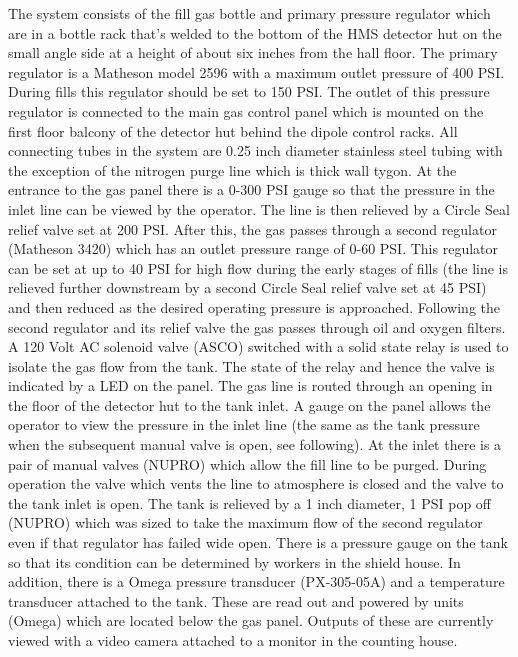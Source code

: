 {The system consists of the fill gas bottle and primary
pressure regulator which are in a bottle rack that's welded to
the bottom of the HMS detector hut on the small angle side at a height
of about six inches from the hall floor. The primary regulator is
a Matheson model 2596 with a maximum outlet pressure of 400 PSI.
During fills this regulator should be set to 150 PSI.
The outlet of this pressure regulator is connected to the
main gas control panel which is mounted on the first floor balcony
of the detector hut behind the dipole control racks. All connecting
tubes in the system are 0.25 inch diameter stainless steel tubing with
the exception of the nitrogen purge line which is thick wall tygon.
At the entrance to the gas panel there is a 0-300 PSI gauge so that
the pressure in the inlet line can be viewed by the operator.
The line is then relieved by a Circle Seal relief valve set at 200 PSI.
After this, the gas passes through a second regulator (Matheson 3420)
which has an
outlet pressure range of 0-60 PSI. This regulator can be set at
up to 40 PSI for high flow during the early stages of fills
(the line is relieved further downstream by a second
Circle Seal relief valve set at 45 PSI) and then reduced as
the desired operating pressure is approached. Following the second regulator
and its relief valve the gas passes through oil and oxygen filters.
A 120 Volt AC solenoid valve (ASCO) switched with a solid state
relay is used to isolate the gas flow from the tank. The state of
the relay and hence the valve is indicated by a LED on the panel.
The gas line is routed through an opening in the floor of the detector hut
to the tank inlet. A gauge on the panel allows the operator to view
the pressure in the inlet line (the same as the tank pressure
when the subsequent manual valve is open, see following).
At the inlet there is a pair of manual valves (NUPRO)
which allow the fill line to be purged.
During operation the valve which vents the
line to atmosphere is closed and the valve to the tank inlet is open.
The tank is relieved by a 1 inch diameter, 1 PSI pop off (NUPRO) which was
sized to take the
maximum flow of the second regulator even if that regulator has failed
wide open. There is a pressure gauge on the tank so that its condition
can be determined by workers in the shield house. In addition,
there is a Omega pressure transducer (PX-305-05A) and a temperature
transducer attached to the tank. These are read out and powered by
units (Omega) which are located below the gas panel.  Outputs of these
are currently viewed with a video camera attached
to a monitor in the counting house.

}

